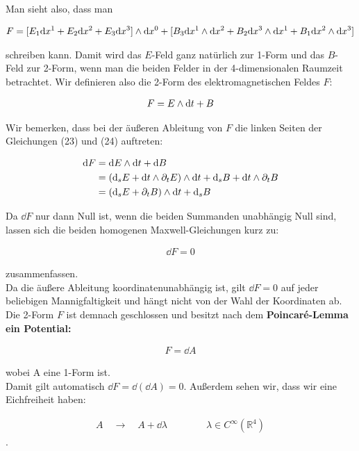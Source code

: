 Man sieht also, dass man

\begin{align}
F = [E_1 \dd x^1 +E_2 \dd x^2+ E_3 \dd x^3] \wedge \dd x^0 + [B_3 \dd x^1 \wedge \dd x^2 + B_2 \dd x^3 \wedge \dd x^1 + B_1 \dd x^2 \wedge \dd x^3]
\end{align}

schreiben kann. Damit wird das $E$-Feld ganz natürlich zur 1-Form und das $B$-Feld zur 2-Form, wenn man die beiden Felder in der 4-dimensionalen Raumzeit betrachtet. Wir definieren also die 2-Form des elektromagnetischen Feldes $F$:

\begin{align}  
F= E \wedge \dd t + B 
\end{align} 

Wir bemerken, dass bei der äußeren Ableitung von $F$ die linken Seiten der Gleichungen (23) und (24) auftreten:

\begin{align}
\dd F &= \dd E \wedge \dd t + \dd B \notag \\
		&= (\dd_s E + \dd t \wedge \partial_t E ) \wedge \dd t + \dd_s B + \dd t \wedge \partial_t B \notag \\
		&= (\dd_s E + \partial_t B) \wedge \dd t + \dd_s B
\end{align}

Da $\dd F$ nur dann Null ist, wenn die beiden Summanden unabhängig Null sind, lassen sich die beiden homogenen Maxwell-Gleichungen kurz zu: 

\begin{align}
\dd F = 0
\end{align}

zusammenfassen. \\



Da die äußere Ableitung koordinatenunabhängig ist, gilt $\dd F = 0$ auf jeder beliebigen Mannigfaltigkeit und hängt nicht von der Wahl der Koordinaten ab. \\
Die 2-Form $F$ ist demnach geschlossen und besitzt nach dem \bfseries Poincaré-Lemma \normalfont ein Potential:

\begin{align}
F = \dd A 
\end{align}

wobei A eine 1-Form ist. \\
Damit gilt automatisch $ \dd F = \dd (\dd A) = 0$. Außerdem sehen wir, dass wir eine Eichfreiheit haben:

\begin{align}
A \quad \rightarrow \quad A + \dd \lambda \qquad\qquad \lambda \in C^{\infty}(\mathbb{R}^4)
\end{align}.

